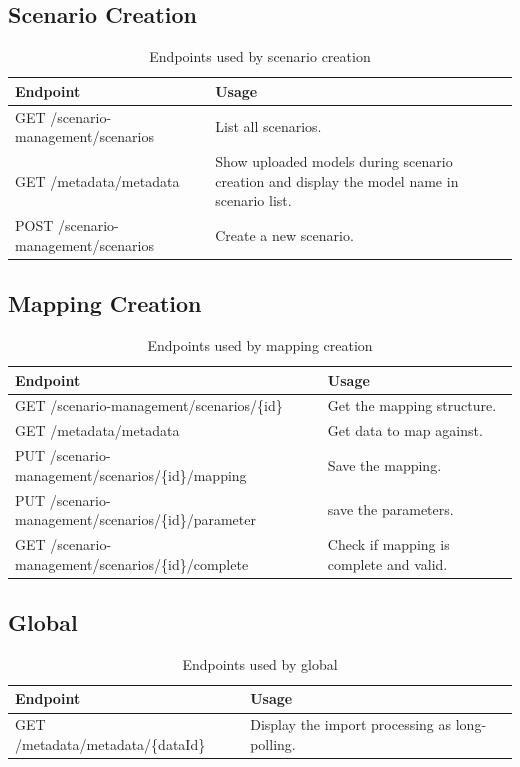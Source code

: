 \subsection{Scenario Creation}
\begin{table}[H]
	\caption{Endpoints used by scenario creation}
	\begin{tabularx}{\textwidth}{|l|X|}
		\hline
		\textbf{Endpoint} & \textbf{Usage} \\ \hline
		GET /scenario-management/scenarios & List all scenarios. \\ \hline
		GET /metadata/metadata & Show uploaded models during scenario creation and display  the model name in scenario list. \\ \hline
		POST /scenario-management/scenarios & Create a new scenario. \\ \hline
	\end{tabularx}
\end{table}


\subsection{Mapping Creation}
\begin{table}[H]
	\caption{Endpoints used by mapping creation}
	\begin{tabularx}{\textwidth}{|l|X|}
		\hline
		\textbf{Endpoint} & \textbf{Usage} \\ \hline
		GET /scenario-management/scenarios/\{id\} & Get the mapping structure. \\ \hline
		GET /metadata/metadata & Get data to map against. \\ \hline
		PUT /scenario-management/scenarios/\{id\}/mapping & Save the mapping. \\ \hline
		PUT /scenario-management/scenarios/\{id\}/parameter & save the parameters. \\ \hline
		GET /scenario-management/scenarios/\{id\}/complete & Check if mapping is complete and valid. \\ \hline
	\end{tabularx}
\end{table}


\subsection{Global}
\begin{table}[H]
	\caption{Endpoints used by global}
	\begin{tabularx}{\textwidth}{|l|X|}
		\hline
		\textbf{Endpoint} & \textbf{Usage} \\ \hline
		GET /metadata/metadata/\{dataId\} & Display the import processing as long-polling. \\ \hline
	\end{tabularx}
\end{table}
